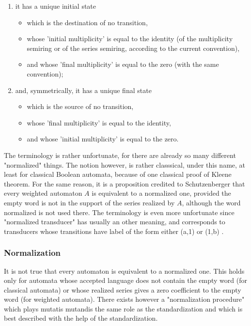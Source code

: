 \begin{enumerate}
\item it has a unique initial state
  \begin{itemize}
  \item which is the destination of no transition,
  \item whose 'initial multiplicity' is equal to the identity (of the
    multiplicity semiring or of the series semiring, according to the
    current convention),
  \item and whose 'final multiplicity' is equal to the zero (with the
    same convention);
  \end{itemize}

\item and, symmetrically, it has a unique final state
  \begin{itemize}
  \item which is the source of no transition,
  \item whose 'final multiplicity' is equal to the identity,
  \item and whose 'initial multiplicity' is equal to the zero.
  \end{itemize}
\end{enumerate}

\begin{remark}
  The terminology is rather unfortunate, for there are already so many
  different "normalized" things. The notion however, is rather
  classsical, under this name, at least for classical Boolean
  automata, because of one classical proof of Kleene theorem. For the
  same reason, it is a proposition credited to Schutzenberger that
  every weighted automaton $A$ is equivalent to a normalized one,
  provided the empty word is not in the support of the series realized
  by $A$, although the word normalized is not used there. The
  terminology is even more unfortunate since "normalized transducer"
  has usually an other meaning, and corresponds to transducers whose
  transitions have label of the form either (a,1) or (1,b) .
\end{remark}

\subsubsection{Normalization}

It is not true that every automaton is equivalent to a normalized one.
This holds only for automata whose accepted language does not contain
the empty word (for classical automata) or whose realized series gives
a zero coefficient to the empty word (for weighted automata). There
exists however a "normalization procedure" which plays mutatis
mutandis the same role as the standardization and which is best
described with the help of the standardization.

